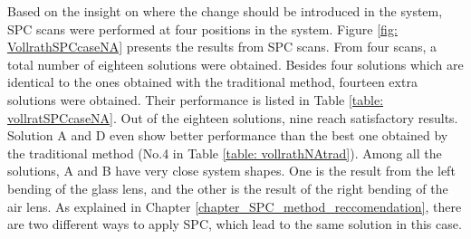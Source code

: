 Based on the insight on where the change should be introduced in the system, SPC scans were performed at four positions in the system. Figure \ref{fig: VollrathSPCcaseNA} presents the results from SPC scans. From four scans, a total number of eighteen solutions were obtained. Besides four solutions which are identical to the ones obtained with the traditional method, fourteen extra solutions were obtained. Their performance is listed in Table \ref{table: vollratSPCcaseNA}. Out of the eighteen solutions, nine reach satisfactory results. Solution A and D even show better performance than the best one obtained by the traditional method (No.4 in Table \ref{table: vollrathNAtrad}). Among all the solutions, A and B have very close system shapes. One is the result from the left bending of the glass lens, and the other is the result of the right bending of the air lens. As explained in Chapter \ref{chapter_SPC_method_reccomendation}, there are two different ways to apply SPC, which lead to the same solution in this case.

\begin{figure}
\end{figure}

